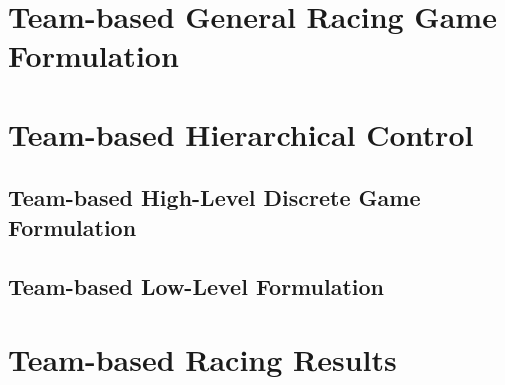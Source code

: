 \section{Team-based General Racing Game Formulation}

\section{Team-based Hierarchical Control}
\subsection{Team-based High-Level Discrete Game Formulation}
\subsection{Team-based Low-Level Formulation}
\section{Team-based Racing Results}